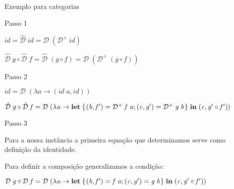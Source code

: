 \documentclass{beamer}
\theoremstyle{definition}
\theoremstyle{definition}
\theoremstyle{theorem}
\newcommand{\Varid}[1]{\mathit{#1}}
\begin{document}
\begin{frame}{Exemplo para categorias}
\begin{block}{Passo 1}

\ensuremath{\Varid{id}\mathrel{=}\mathcal{\hat{D}}\;\Varid{id}\mathrel{=}\mathcal{D}\;(\mathcal{D}^{+}\;\Varid{id})}

\ensuremath{\mathcal{\hat{D}}\;\Varid{g}\mathbin{\circ}\mathcal{\hat{D}}\;\Varid{f}\mathrel{=}\mathcal{\hat{D}}\;(\Varid{g}\mathbin{\circ}\Varid{f})\mathrel{=}\mathcal{D}\;(\mathcal{D}^{+}\;(\Varid{g}\mathbin{\circ}\Varid{f}))}

\end{block}

\pause

\begin{block}{Passo 2}

\ensuremath{\Varid{id}\mathrel{=}\mathcal{D}\;(\lambda \Varid{a}\rightarrow (\Varid{id}\;\Varid{a},\Varid{id}))}

\ensuremath{\mathcal{\hat{D}}\;\Varid{g}\mathbin{\circ}\mathcal{\hat{D}}\;\Varid{f}\mathrel{=}\mathcal{D}\;(\lambda \Varid{a}\rightarrow \mathbf{let}\;\{\mskip1.5mu (\Varid{b},\Varid{f'})\mathrel{=}\mathcal{D}^{+}\;\Varid{f}\;\Varid{a};(\Varid{c},\Varid{g'})\mathrel{=}\mathcal{D}^{+}\;\Varid{g}\;\Varid{b}\mskip1.5mu\}\;\mathbf{in}\;(\Varid{c},\Varid{g'}\mathbin{\circ}\Varid{f'}))}

\end{block}

\pause

\begin{block}{Passo 3}

Para a nossa instância a primeira equação que determinamos serve como definição da identidade.

Para definir a composição generalizamos a condição:

\ensuremath{\mathcal{D}\;\Varid{g}\mathbin{\circ}\mathcal{D}\;\Varid{f}\mathrel{=}\mathcal{D}\;(\lambda \Varid{a}\rightarrow \mathbf{let}\;\{\mskip1.5mu (\Varid{b},\Varid{f'})\mathrel{=}\Varid{f}\;\Varid{a};(\Varid{c},\Varid{g'})\mathrel{=}\Varid{g}\;\Varid{b}\mskip1.5mu\}\;\mathbf{in}\;(\Varid{c},\Varid{g'}\mathbin{\circ}\Varid{f'}))}

\end{block}
\end{frame}
\end{document}
